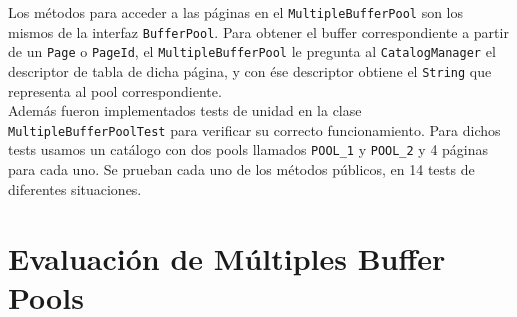 \documentclass[a4paper,10pt]{article}
\begin{document}
Los métodos para acceder a las páginas en el \texttt{MultipleBufferPool} son los mismos de la interfaz \texttt{BufferPool}. Para obtener el buffer correspondiente a partir de un \texttt{Page} o \texttt{PageId}, el \texttt{MultipleBufferPool} le pregunta al \texttt{CatalogManager} el descriptor de tabla de dicha página, y con ése descriptor obtiene el \texttt{String} que representa al pool correspondiente.\\

Además fueron implementados tests de unidad en la clase \texttt{MultipleBufferPoolTest} para verificar su correcto funcionamiento. Para dichos tests usamos un catálogo con dos pools llamados \texttt{POOL\_1} y \texttt{POOL\_2} y 4 páginas para cada uno. Se prueban cada uno de los métodos públicos, en 14 tests de diferentes situaciones.

\newpage

\section{Evaluación de Múltiples Buffer Pools}
\end{document}
